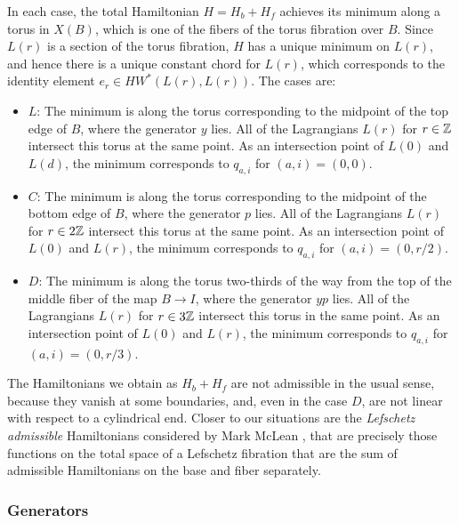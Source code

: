 \documentclass[12pt]{amsart}
\begin{document}
In each case, the total Hamiltonian $H = H_b + H_f$ achieves its minimum along a torus in $X(B)$, which is one of the fibers of the torus fibration over $B$. Since $L(r)$ is a section of the torus fibration, $H$ has a unique minimum on $L(r)$, and hence there is a unique constant chord for $L(r)$, which corresponds to the identity element $e_r \in HW^*(L(r),L(r))$. The cases are:
\begin{itemize}
\item $L$: The minimum is along the torus corresponding to the midpoint of the top edge of $B$, where the generator $y$ lies. All of the Lagrangians $L(r)$ for $r \in \mathbb{Z}$ intersect this torus at the same point. As an intersection point of $L(0)$ and $L(d)$, the minimum corresponds to $q_{a,i}$ for $(a,i) = (0,0)$.
\item $C$: The minimum is along the torus corresponding to the midpoint of the bottom edge of $B$, where the generator $p$ lies. All of the Lagrangians $L(r)$ for $r \in 2\mathbb{Z}$ intersect this torus at the same point. As an intersection point of $L(0)$ and $L(r)$, the minimum corresponds to $q_{a,i}$ for $(a,i)= (0,r/2)$.
\item $D$: The minimum is along the torus two-thirds of the way from the top of the middle fiber of the map $B \to I$, where the generator $yp$ lies. All of the Lagrangians $L(r)$ for $r \in 3\mathbb{Z}$ intersect this torus in the same point. As an intersection point of $L(0)$ and $L(r)$, the minimum corresponds to $q_{a,i}$ for $(a,i) = (0,r/3)$.
\end{itemize}



\begin{remark}
  The Hamiltonians we obtain as $H_b + H_f$ are not admissible in the
  usual sense, because they vanish at some boundaries, and, even in
  the case $D$, are not linear with respect to a cylindrical
  end. Closer to our situations are the \emph{Lefschetz admissible}
  Hamiltonians considered by Mark McLean \cite{mclean-lf-sh}, that are
  precisely those functions on the total space of a Lefschetz
  fibration that are the sum of admissible Hamiltonians on the base
  and fiber separately.
\end{remark}

\subsubsection{Generators}
\label{sec:generators}
\end{document}
